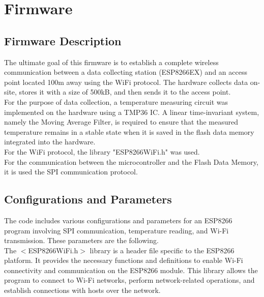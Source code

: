 \newpage

\section{Firmware}\label{04Sec:Firmware}


\subsection{Firmware Description}\label{04Sub:FirmwareDescription}

The ultimate goal of this firmware is to establish a complete wireless communication 
between a data collecting station (ESP8266EX) and an access point located 100m away 
using the WiFi protocol. The hardware collects data on-site, stores it with a size of 500kB, 
and then sends it to the access point. \\ 

For the purpose of data collection, a temperature measuring circuit was implemented
on the hardware using a TMP36 IC. A linear time-invariant system, namely the Moving 
Average Filter, is required to ensure that the measured temperature remains in a stable
state when it is saved in the flash data memory integrated into the hardware. \\ 

For the WiFi protocol, the library "ESP8266WiFi.h" was used. \\
  

For the communication between the microcontroller and the Flash Data Memory, it is used the SPI 
communication protocol.



\subsection{Configurations and Parameters}\label{04Sub: ConfigurationsAndParameters}


The code includes various configurations and parameters for an ESP8266 program involving SPI communication, temperature reading, 
and Wi-Fi transmission. These parameters are the following. \\ 


The $<$ESP8266WiFi.h$>$ library is a header file specific to the ESP8266 platform. It provides the necessary functions and definitions to enable 
Wi-Fi connectivity and communication on the ESP8266 module. This library allows the program to connect to Wi-Fi networks, perform 
network-related operations, and establish connections with hosts over the network.

